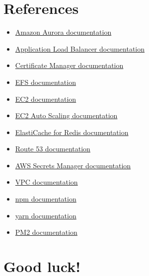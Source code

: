 \documentclass{article}
\begin{document}
\section{References}\label{references}
\begin{itemize}
\item \href{https://docs.aws.amazon.com/AmazonRDS/latest/AuroraUserGuide/CHAP_AuroraOverview.html}{Amazon Aurora documentation}
\item \href{https://docs.aws.amazon.com/elasticloadbalancing/latest/application/introduction.html}{Application Load Balancer documentation}
\item \href{https://docs.aws.amazon.com/acm/latest/userguide/acm-overview.html}{Certificate Manager documentation}
\item \href{https://docs.aws.amazon.com/efs/latest/ug/whatisefs.html}{EFS documentation}
\item \href{https://docs.aws.amazon.com/AWSEC2/latest/UserGuide/concepts.html}{EC2 documentation}
\item \href{https://docs.aws.amazon.com/autoscaling/ec2/userguide/what-is-amazon-ec2-auto-scaling.html}{EC2 Auto Scaling documentation}
\item \href{https://docs.aws.amazon.com/AmazonElastiCache/latest/red-ug/WhatIs.html}{ElastiCache for Redis documentation}
\item \href{https://docs.aws.amazon.com/Route53/latest/DeveloperGuide/Welcome.html}{Route 53 documentation}
\item \href{https://docs.aws.amazon.com/secretsmanager/latest/userguide/intro.html}{AWS Secrets Manager documentation}
\item \href{https://docs.aws.amazon.com/vpc/latest/userguide/what-is-amazon-vpc.html}{VPC documentation}
\item \href{https://docs.npmjs.com/cli/v8/commands/}{npm documentation}
\item \href{https://classic.yarnpkg.com/en/docs}{yarn documentation}
\item \href{https://pm2.keymetrics.io/docs/usage/process-management/}{PM2 documentation}
\end{itemize}

\section*{Good luck!}
\end{document}
